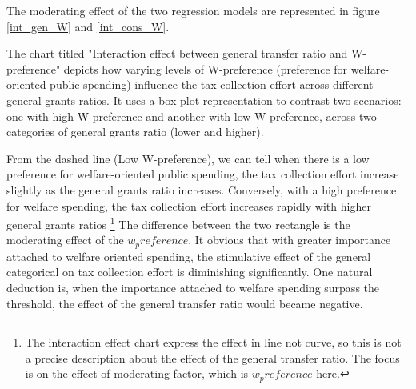 The moderating effect of the two regression models are represented in figure \ref{int_gen_W} and \ref{int_cons_W}.


The chart titled "Interaction effect between general transfer ratio and W-preference" depicts how varying levels of W-preference (preference for welfare-oriented public spending) influence the tax collection effort across different general grants ratios. It uses a box plot representation to contrast two scenarios: one with high W-preference and another with low W-preference, across two categories of general grants ratio (lower and higher).

From the dashed line (Low W-preference), we can tell when there is a low preference for welfare-oriented public spending, the tax collection effort increase slightly as the general grants ratio increases. Conversely, with a high preference for welfare spending, the tax collection effort increases rapidly with higher general grants ratios \footnote{The interaction effect chart express the effect in line not curve, so this is not a precise description about the effect of the general transfer ratio. The focus is on the effect of moderating factor, which is $w_preference$ here. } The difference between the two rectangle is the moderating effect of the $w_preference$. It obvious that with greater importance attached to welfare oriented spending, the stimulative effect of the general categorical on tax collection effort is diminishing significantly. One natural deduction is, when the importance attached to welfare spending surpass the threshold, the effect of the general transfer ratio would became negative.


